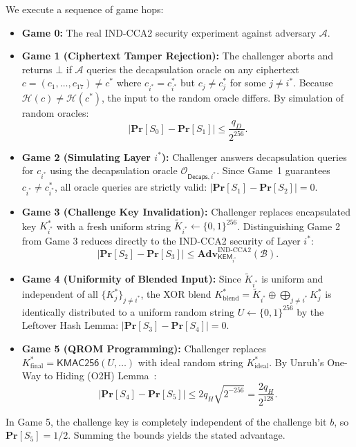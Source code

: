 \documentclass{ieeeaccess}
\renewcommand{\Pr}{\mathbf{Pr}}
\newcommand{\Adv}{\mathbf{Adv}}
\newcommand{\calA}{\mathcal{A}}
\newcommand{\calB}{\mathcal{B}}
\newcommand{\calO}{\mathcal{O}}
\newenvironment{proof}{\begin{IEEEproof}\IEEEQEDoff}{\end{IEEEproof}}
\begin{document}
\begin{proof}
We execute a sequence of game hops:
\begin{itemize}
  \item \textbf{Game 0:} The real IND-CCA2 security experiment against adversary $\calA$.
  \item \textbf{Game 1 (Ciphertext Tamper Rejection):} The challenger aborts and returns $\bot$ if $\calA$ queries the decapsulation oracle on any ciphertext $c = (c_1,\dots,c_{17}) \ne c^*$ where $c_{i^*} = c_{i^*}^*$ but $c_j \ne c_j^*$ for some $j \ne i^*$. Because $\mathcal{H}(c) \ne \mathcal{H}(c^*)$, the input to the random oracle differs. By simulation of random oracles:
  \begin{equation}
    |\Pr[S_0] - \Pr[S_1]| \le \frac{q_D}{2^{256}}.
  \end{equation}
  \item \textbf{Game 2 (Simulating Layer $i^*$):} Challenger answers decapsulation queries for $c_{i^*}$ using the decapsulation oracle $\calO_{\mathsf{Decaps}, i^*}$. Since Game~1 guarantees $c_{i^*} \ne c_{i^*}^*$, all oracle queries are strictly valid: $|\Pr[S_1] - \Pr[S_2]| = 0$.
  \item \textbf{Game 3 (Challenge Key Invalidation):} Challenger replaces encapsulated key $K_{i^*}^*$ with a fresh uniform string $\widetilde{K}_{i^*} \gets \{0,1\}^{256}$. Distinguishing Game 2 from Game 3 reduces directly to the IND-CCA2 security of Layer $i^*$:
  \begin{equation}
    |\Pr[S_2] - \Pr[S_3]| \le \Adv_{\mathsf{KEM}_{i^*}}^{\mathrm{IND\text{-}CCA2}}(\calB).
  \end{equation}
  \item \textbf{Game 4 (Uniformity of Blended Input):} Since $\widetilde{K}_{i^*}$ is uniform and independent of all $\{K_j^*\}_{j \neq i^*}$, the XOR blend $K_{\mathrm{blend}}^* = \widetilde{K}_{i^*} \oplus \bigoplus_{j \ne i^*} K_j^*$ is identically distributed to a uniform random string $U \gets \{0,1\}^{256}$ by the Leftover Hash Lemma: $|\Pr[S_3] - \Pr[S_4]| = 0$.
  \item \textbf{Game 5 (QROM Programming):} Challenger replaces $K_{\mathrm{final}}^* = \mathsf{KMAC256}(U, \dots)$ with ideal random string $K_{\mathrm{ideal}}^*$. By Unruh's One-Way to Hiding (O2H) Lemma~\cite{Zhandry2012}:
  \begin{equation}
    |\Pr[S_4] - \Pr[S_5]| \le 2 q_H \sqrt{2^{-256}} = \frac{2 q_H}{2^{128}}.
  \end{equation}
\end{itemize}
In Game 5, the challenge key is completely independent of the challenge bit $b$, so $\Pr[S_5] = 1/2$. Summing the bounds yields the stated advantage.
\end{proof}
\end{document}
